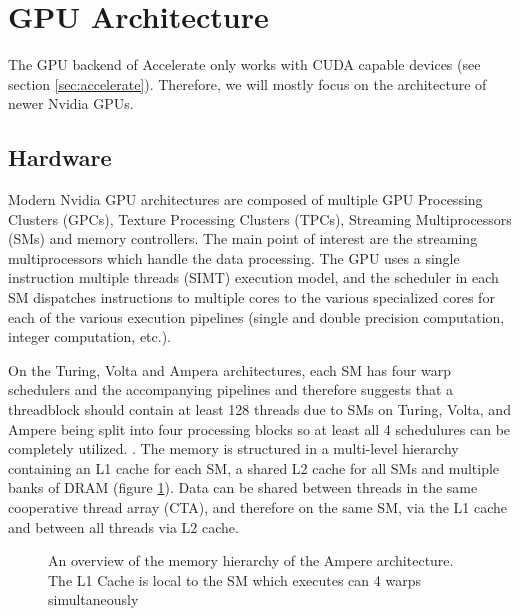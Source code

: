 \section{GPU Architecture}
The GPU backend of Accelerate only works with CUDA capable devices (see section \ref{sec:accelerate}).
Therefore, we will mostly focus on the architecture of newer Nvidia GPUs.

\subsection{Hardware}
Modern Nvidia GPU architectures are composed of multiple GPU Processing Clusters (GPCs), Texture Processing Clusters (TPCs), Streaming Multiprocessors (SMs) and memory controllers.
The main point of interest are the streaming multiprocessors which handle the data processing.
The GPU uses a single instruction multiple threads (SIMT) execution model, and the scheduler in each SM dispatches instructions to multiple cores to the various specialized cores for each of the various execution pipelines (single and double precision computation, integer computation, etc.).

On the Turing, Volta and Ampera architectures, each SM has four warp schedulers and the accompanying pipelines and therefore \citet{jia2019dissecting} suggests that a threadblock should contain at least 128 threads due to SMs on Turing, Volta, and Ampere being split into four processing blocks so at least all 4 schedulures can be completely utilized. \cite{jia2019dissecting,nvidia2017volta,nvidia2018turing,nvidia2020ampere}.
The memory is structured in a multi-level hierarchy containing an L1 cache for each SM, a shared L2 cache for all SMs and multiple banks of DRAM \cite{nvidia2017volta,nvidia2020ampere} (figure \ref{fig:ampere_architecture}).
Data can be shared between threads in the same cooperative thread array (CTA), and therefore on the same SM, via the L1 cache and between all threads via L2 cache.

\begin{figure}[!hb]
    \centering
    \caption{
        An overview of the memory hierarchy of the Ampere architecture. The L1 Cache is local to the SM which executes can 4 warps simultaneously 
    }
    \label{fig:ampere_architecture}
\end{figure}

